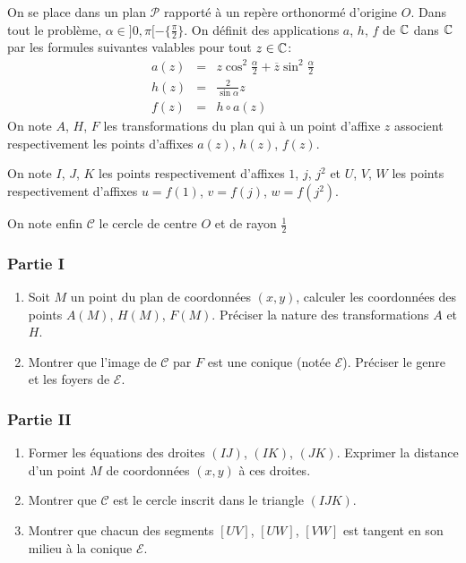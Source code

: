 On se place dans un plan $\mathcal P$ rapporté à un repère orthonormé d'origine $O$. Dans tout le problème, $\alpha \in ]0,\pi[ -\{\frac{\pi}{2}\}$.\newline
On définit des applications $a$, $h$, $f$ de $\mathbb{C}$ dans $\mathbb{C}$ par les formules suivantes valables pour tout $z\in \mathbb{C}$:
\begin{eqnarray*}
 a(z) &=& z\cos^2\frac{\alpha}{2}+\overline{z}\sin^2\frac{\alpha}{2}\\
h(z) &=& \frac{2}{\sin \alpha}z \\
f(z) &=& h\circ a (z)
\end{eqnarray*}
On note $A$, $H$, $F$ les transformations du plan qui à un point d'affixe $z$ associent respectivement les points d'affixes $a(z)$, $h(z)$, $f(z)$.

On note $I$, $J$, $K$ les points respectivement d'affixes $1$, $j$, $j^2$ et  $U$, $V$, $W$ les points respectivement d'affixes $u=f(1)$, $v=f(j)$, $w=f(j^2)$.

On note enfin $\mathcal C$ le cercle de centre $O$ et de rayon $\frac{1}{2}$

\subsubsection*{Partie I}
\begin{enumerate}
 \item Soit $M$ un point du plan de coordonnées $(x,y)$, calculer les coordonnées des points $A(M)$, $H(M)$, $F(M)$. Préciser la nature des transformations $A$ et $H$.
\item Montrer que l'image de $\mathcal C$ par $F$ est une conique (notée $\mathcal E$). Préciser le genre et les foyers de $\mathcal E$.
\end{enumerate}

\subsubsection*{Partie II}
\begin{enumerate}
 \item Former les équations des droites $(IJ)$, $(IK)$, $(JK)$. Exprimer la distance d'un point $M$ de coordonnées $(x,y)$ à ces droites.
\item Montrer que $\mathcal C$ est le cercle inscrit dans le triangle $(IJK)$.
\item Montrer que chacun des segments $[UV]$, $[UW]$, $[VW]$ est tangent en son milieu à la conique $\mathcal E$.
\end{enumerate}

